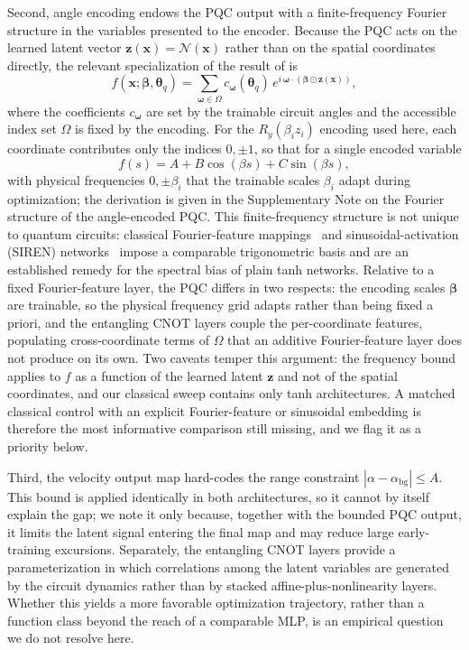 \documentclass[11pt,a4paper]{article}
\begin{document}
Second, angle encoding endows the PQC output with a finite-frequency Fourier structure in the variables presented to the encoder. Because the PQC acts on the learned latent vector $\mathbf{z}(\mathbf{x}) = \mathcal{N}(\mathbf{x})$ rather than on the spatial coordinates directly, the relevant specialization of the result of \citet{schuld2021effect} is
\begin{equation}
    f(\mathbf{x};\boldsymbol{\beta},\boldsymbol{\theta}_q) = \sum_{\boldsymbol{\omega}\in\Omega} c_{\boldsymbol{\omega}}(\boldsymbol{\theta}_q)\, e^{i\,\boldsymbol{\omega}\cdot(\boldsymbol{\beta}\odot\mathbf{z}(\mathbf{x}))},
\end{equation}
where the coefficients $c_{\boldsymbol{\omega}}$ are set by the trainable circuit angles and the accessible index set $\Omega$ is fixed by the encoding. For the $R_y(\beta_i z_i)$ encoding used here, each coordinate contributes only the indices $0,\pm 1$, so that for a single encoded variable
\begin{equation}
    f(s)=A+B\cos(\beta s)+C\sin(\beta s),
\end{equation}
with physical frequencies $0,\pm\beta_i$ that the trainable scales $\beta_i$ adapt during optimization; the derivation is given in the Supplementary Note on the Fourier structure of the angle-encoded PQC. This finite-frequency structure is not unique to quantum circuits: classical Fourier-feature mappings~\citep{tancik2020fourier} and sinusoidal-activation (SIREN) networks~\citep{sitzmann2020siren} impose a comparable trigonometric basis and are an established remedy for the spectral bias of plain tanh networks. Relative to a fixed Fourier-feature layer, the PQC differs in two respects: the encoding scales $\boldsymbol{\beta}$ are trainable, so the physical frequency grid adapts rather than being fixed a priori, and the entangling CNOT layers couple the per-coordinate features, populating cross-coordinate terms of $\Omega$ that an additive Fourier-feature layer does not produce on its own. Two caveats temper this argument: the frequency bound applies to $f$ as a function of the learned latent $\mathbf{z}$ and not of the spatial coordinates, and our classical sweep contains only tanh architectures. A matched classical control with an explicit Fourier-feature or sinusoidal embedding is therefore the most informative comparison still missing, and we flag it as a priority below.

Third, the velocity output map hard-codes the range constraint $|\alpha-\alpha_\text{bg}|\leq A$. This bound is applied identically in both architectures, so it cannot by itself explain the gap; we note it only because, together with the bounded PQC output, it limits the latent signal entering the final map and may reduce large early-training excursions. Separately, the entangling CNOT layers provide a parameterization in which correlations among the latent variables are generated by the circuit dynamics rather than by stacked affine-plus-nonlinearity layers. Whether this yields a more favorable optimization trajectory, rather than a function class beyond the reach of a comparable MLP, is an empirical question we do not resolve here.
\end{document}
